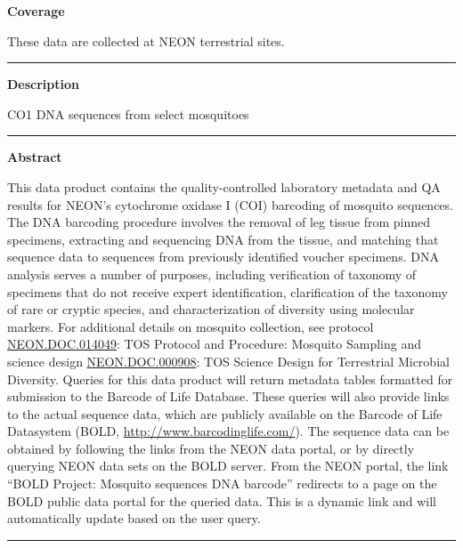 \documentclass[]{article}
\begin{document}
\textbf{Coverage}

These data are collected at NEON terrestrial sites.

\begin{center}\rule{0.5\linewidth}{\linethickness}\end{center}

\textbf{Description}

CO1 DNA sequences from select mosquitoes

\begin{center}\rule{0.5\linewidth}{\linethickness}\end{center}

\textbf{Abstract}

This data product contains the quality-controlled laboratory metadata
and QA results for NEON's cytochrome oxidase I (COI) barcoding of
mosquito sequences. The DNA barcoding procedure involves the removal of
leg tissue from pinned specimens, extracting and sequencing DNA from the
tissue, and matching that sequence data to sequences from previously
identified voucher specimens. DNA analysis serves a number of purposes,
including verification of taxonomy of specimens that do not receive
expert identification, clarification of the taxonomy of rare or cryptic
species, and characterization of diversity using molecular markers. For
additional details on mosquito collection, see protocol
\href{http://data.neonscience.org/api/v0/documents/NEON.DOC.014049vH}{NEON.DOC.014049}:
TOS Protocol and Procedure: Mosquito Sampling and science design
\href{http://data.neonscience.org/api/v0/documents/NEON.DOC.NEON.DOC.000908vA}{NEON.DOC.000908}:
TOS Science Design for Terrestrial Microbial Diversity. Queries for this
data product will return metadata tables formatted for submission to the
Barcode of Life Database. These queries will also provide links to the
actual sequence data, which are publicly available on the Barcode of
Life Datasystem (BOLD, \url{http://www.barcodinglife.com/}). The
sequence data can be obtained by following the links from the NEON data
portal, or by directly querying NEON data sets on the BOLD server. From
the NEON portal, the link ``BOLD Project: Mosquito sequences DNA
barcode'' redirects to a page on the BOLD public data portal for the
queried data. This is a dynamic link and will automatically update based
on the user query.

\begin{center}\rule{0.5\linewidth}{\linethickness}\end{center}
\end{document}

